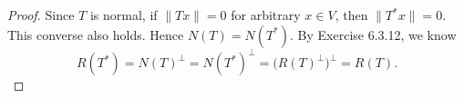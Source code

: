 \begin{Exercise}
	\begin{proof}
		Since $T$ is normal, if $\|T x\| = 0$ for arbitrary $x\in V$, then $\|T^* x \| = 0$. This converse also holds. Hence $N(T) = N(T^*)$. By Exercise 6.3.12, we know 
		$$
		R(T^*) = N(T)^{\perp} = N(T^*)^{\perp} = \big(R(T)^{\perp}\big)^{\perp} = R(T).
		$$
	\end{proof}
\end{Exercise}
